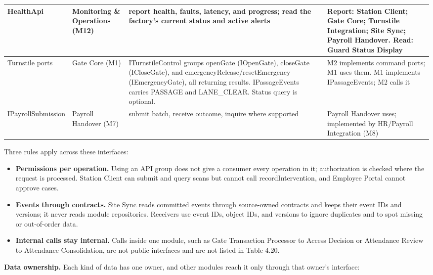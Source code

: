 {\begin{longtable}{|>{\raggedright\arraybackslash}p{92pt}|>{\raggedright\arraybackslash}p{68pt}|>{\raggedright\arraybackslash}p{132pt}|>{\raggedright\arraybackslash}p{105pt}|}
\hline
HealthApi & Monitoring \& Operations (M12) & report health, faults, latency, and progress; read the factory's current status and active alerts & Report: Station Client; Gate Core; Turnstile Integration; Site Sync; Payroll Handover. Read: Guard Status Display \\
\hline
Turnstile ports & Gate Core (M1) & ITurnstileControl groups openGate (IOpenGate), closeGate (ICloseGate), and emergencyRelease/resetEmergency (IEmergencyGate), all returning results. IPassageEvents carries PASSAGE and LANE\_CLEAR. Status query is optional. & M2 implements command ports; M1 uses them. M1 implements IPassageEvents; M2 calls it \\
\hline
IPayrollSubmission & Payroll Handover (M7) & submit batch, receive outcome, inquire where supported & Payroll Handover uses; implemented by HR/Payroll Integration (M8) \\
\hline
\end{longtable}
}

Three rules apply across these interfaces:

\begin{itemize}[leftmargin=36pt, itemsep=2pt, topsep=4pt, parsep=2pt]
  \item \textbf{Permissions per operation.} Using an API group does not give a consumer every operation in it; authorization is checked where the request is processed. Station Client can submit and query scans but cannot call recordIntervention, and Employee Portal cannot approve cases.
  \item \textbf{Events through contracts.} Site Sync reads committed events through source-owned contracts and keeps their event IDs and versions; it never reads module repositories. Receivers use event IDs, object IDs, and versions to ignore duplicates and to spot missing or out-of-order data.
  \item \textbf{Internal calls stay internal.} Calls inside one module, such as Gate Transaction Processor to Access Decision or Attendance Review to Attendance Consolidation, are not public interfaces and are not listed in Table 4.20.
\end{itemize}

\textbf{Data ownership.} Each kind of data has one owner, and other modules reach it only through that owner's interface:

